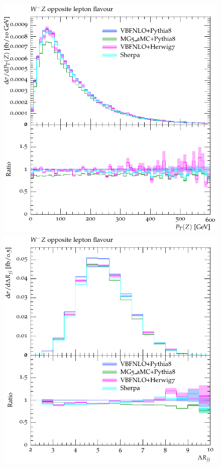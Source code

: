 \documentclass[11pt]{cernrep}
\begin{document}
\begin{figure}[htbp]
\begin{center}
   \includegraphics[scale=0.65]{figs/VBFNLO_WmZ_OF_ZPt}
   \includegraphics[scale=0.65]{figs/VBFNLO_WmZ_OF_dRjj}

\end{center}
\end{figure}
\end{document}
